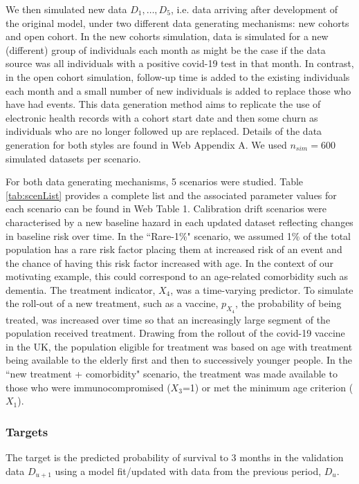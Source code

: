 \documentclass[]{article}
\begin{document}
We then simulated new data $D_1, \ldots , D_5$, i.e. data arriving after development of the original model, under two different data generating mechanisms: new cohorts and open cohort. In the new cohorts simulation, data is simulated for a new (different) group of individuals each month as might be the case if the data source was all individuals with a positive covid-19 test in that month. In contrast, in the open cohort simulation, follow-up time is added to the existing individuals each month and a small number of new individuals is added to replace those who have had events. This data generation method aims to replicate the use of electronic health records with a cohort start date and then some churn as individuals who are no longer followed up are replaced. Details of the data generation for both styles are found in Web Appendix A. We used $n_{sim}=$600 simulated datasets per scenario. 


For both data generating mechanisms, 5 scenarios were studied. Table \ref{tab:scenList} provides a complete list and the associated parameter values for each scenario can be found in Web Table 1. Calibration drift scenarios were characterised by a new baseline hazard in each updated dataset reflecting changes in baseline risk over time. In the ``Rare-1\%" scenario, we assumed 1\% of the total population has a rare risk factor placing them at increased risk of an event and the chance of having this risk factor increased with age. In the context of our motivating example, this could correspond to an age-related comorbidity such as dementia. The treatment indicator, $X_4$, was a time-varying predictor. To simulate the roll-out of a new treatment, such as a vaccine, $p_{X_4}$, the probability of being treated, was increased over time so that an increasingly large segment of the population received treatment. Drawing from the rollout of the covid-19 vaccine in the UK, the population eligible for treatment was based on age with treatment being available to the elderly first and then to successively younger people. In the ``new treatment + comorbidity" scenario, the treatment was made available to those who were immunocompromised ($X_3$=1) or met the minimum age criterion ($X_1$). 



\begin{table}
	
	\label{tab:scenList}	
\end{table}



\subsubsection{Targets}
The target is the predicted probability of survival to 3 months in the validation data $D_{u+1}$ using a model fit/updated with data from the previous period, $D_u$.  
\end{document}

